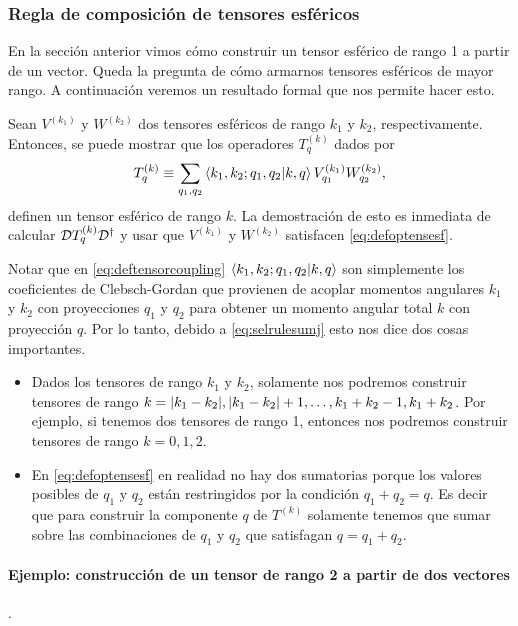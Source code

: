 \documentclass[10pt, a4paper]{article}
\numberwithin{equation}{subsection}
\begin{document}
\subsubsection{Regla de composición de tensores esféricos}
\label{sec:reglacomptens}

En la sección anterior vimos cómo construir un tensor esférico de rango 1 a
partir de un vector. Queda la pregunta de cómo armarnos tensores esféricos de
mayor rango. A continuación veremos un resultado formal que nos permite hacer
esto.

\bigbreak

Sean $V^{(k_1)}$ y $W^{(k_2)}$ dos tensores esféricos de rango $k_1$ y $k_2$,
respectivamente. Entonces, se puede mostrar que los operadores $T^{(k)}_q$
dados por
\begin{equation} \label{eq:deftensorcoupling}
  T^{(k)}_{q} \equiv \sum_{q_1, q_2} \braket{{k_1},{k_2};{q_1},{q_2}}{{k},{q}}
  V^{(k_1)}_{q_1} W^{(k_2)}_{q_2},
\end{equation}
definen un tensor esférico de rango $k$. La demostración de esto es inmediata
de calcular $\RotationOp T^{(k)}_{q} \RotationOp^\dagger$ y usar que $V^{(k_1)}$
y $W^{(k_2)}$ satisfacen \eqref{eq:defoptensesf}.

Notar que en \eqref{eq:deftensorcoupling}
$\braket{{k_1},{k_2};{q_1},{q_2}}{{k},{q}}$ son simplemente los coeficientes de
Clebsch-Gordan que provienen de acoplar momentos angulares $k_1$ y $k_2$ con
proyecciones $q_1$ y $q_2$ para obtener un momento angular total $k$ con
proyección $q$. Por lo tanto, debido a \eqref{eq:selrulesumj} esto nos dice dos
cosas importantes.
\begin{itemize}
  \item Dados los tensores de rango $k_1$ y $k_2$, solamente nos podremos
    construir tensores de rango $k = \abs{k_1 - k_2}, \abs{k_1 - k_2} + 1,
    \ldots, k_1 + k_2 - 1, k_1 + k_2$. Por ejemplo, si tenemos dos tensores de
    rango 1, entonces nos podremos construir tensores de rango $k = 0, 1, 2$.
  \item En \eqref{eq:defoptensesf} en realidad no hay dos sumatorias porque los
    valores posibles de $q_1$ y $q_2$ están restringidos por la condición $q_1
    + q_2 = q$. Es decir que para construir la componente $q$ de $T^{(k)}$
    solamente tenemos que sumar sobre las combinaciones de $q_1$ y $q_2$ que
    satisfagan $q = q_1 + q_2$.
\end{itemize}

\paragraph{Ejemplo: construcción de un tensor de rango 2 a partir de dos
  vectores}. \\
\end{document}

